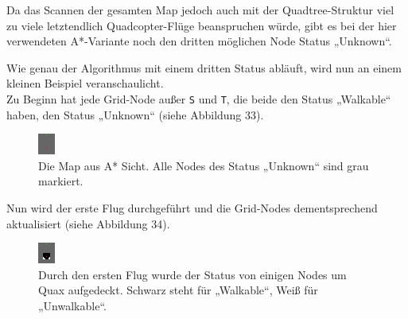 \documentclass[a4paper,12pt]{article}
\newcommand{\code}{\texttt}
\begin{document}
Da das Scannen der gesamten Map jedoch auch mit der Quadtree-Struktur viel zu viele letztendlich Quadcopter-Flüge beanspruchen würde, gibt es bei der hier verwendeten A*-Variante noch den dritten möglichen Node Status „Unknown“.

Wie genau der Algorithmus mit einem dritten Status abläuft, wird nun an einem kleinen Beispiel veranschaulicht.
\\[0.4cm]
Zu Beginn hat jede Grid-Node außer \code{S} und \code{T}, die beide den Status „Walkable“ haben, den Status „Unknown“ (siehe Abbildung 33). 
\begin{figure}[H]
\centering
    \includegraphics[width=.5\linewidth]{Bilder/Aufgabe3/Teilaufgabe_A/Beispiel_01.png}
    \caption{Die Map aus A* Sicht. Alle Nodes des Status „Unknown“ sind grau markiert.}
\end{figure}
Nun wird der erste Flug durchgeführt und die Grid-Nodes dementsprechend aktualisiert (siehe Abbildung 34).
\begin{figure}[H]
\centering
    \includegraphics[width=.5\linewidth]{Bilder/Aufgabe3/Teilaufgabe_A/Beispiel_02.png}
    \caption{Durch den ersten Flug wurde der Status von einigen Nodes um Quax aufgedeckt. Schwarz steht für „Walkable“, Weiß für „Unwalkable“.}
\end{figure}
\end{document}
